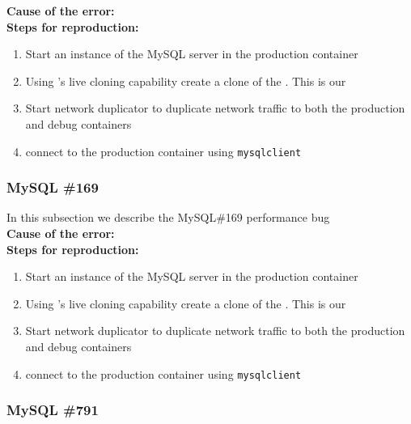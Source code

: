 \noindent \textbf{Cause of the error:} \\

\noindent \textbf{Steps for reproduction:} \\

\begin{adjustwidth}{0.5cm}{}
	\begin{enumerate}
		\item Start an instance of the MySQL server in the production container
		\item Using \parikshan's live cloning capability create a clone of the \productioncontainer. This is our \debugcontainer
		\item Start network duplicator to duplicate network traffic to both the production and debug containers
		\item connect to the production container using \texttt{mysqlclient}
	\end{enumerate}
\end{adjustwidth}	


\subsubsection{MySQL \#169}

In this subsection we describe the MySQL\#169 performance bug \\

\noindent \textbf{Cause of the error:} \\

\noindent \textbf{Steps for reproduction:} \\

\begin{adjustwidth}{0.5cm}{}
	\begin{enumerate}
		\item Start an instance of the MySQL server in the production container
		\item Using \parikshan's live cloning capability create a clone of the \productioncontainer. This is our \debugcontainer
		\item Start network duplicator to duplicate network traffic to both the production and debug containers
		\item connect to the production container using \texttt{mysqlclient}
	\end{enumerate}
\end{adjustwidth}	


\subsubsection{MySQL \#791}

